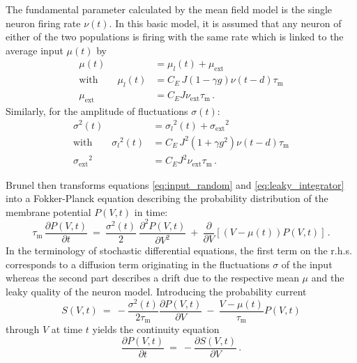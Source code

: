 The fundamental parameter calculated by the mean field model is the single neuron
firing rate $\nu(t)$. In this basic model, it is assumed that any neuron of either 
of the two populations is firing with the same rate which is linked to the 
average input $\mu(t)$ by
\begin{equation}
    \begin{split}
        \mu(t)          &= \mu_l(t) + \mu_\text{ext} \\
        \text{with} \qquad \mu_l(t)        &= C_E \, J (1 - \gamma g) \nu(t - d) \tau_\text{m} \\
        \mu_\text{ext}  &= C_E J \nu_\text{ext} \tau_\text{m} \,.
        \label{eq:mu}
    \end{split}
\end{equation}
Similarly, for the amplitude of fluctuations $\sigma(t)$:
\begin{equation}
    \begin{split}
        \sigma^2(t)     &= {\sigma_l}^2(t) + {\sigma_\text{ext}}^2 \\
        \text{with} \qquad {\sigma_l}^2(t)       
                        &= C_E \, J^2 (1 + \gamma g^2) \nu(t - d) \tau_\text{m} \\
        {\sigma_\text{ext}}^2  &= C_E J^2 \nu_\text{ext} \tau_\text{m} \,.
        \label{eq:sigma}
    \end{split}
\end{equation}

Brunel then transforms equations \eqref{eq:input_random} and \eqref{eq:leaky_integrator}
into a Fokker-Planck equation describing the probability distribution of the membrane 
potential $P(V, t)$ in time: 
\begin{equation}
    \tau_\text{m} \, \frac{\partial P(V, t)}{\partial t} 
       \: = \: \frac{\sigma^2(t)}{2}  \: \frac{\partial^2 P(V, t)}{\partial V^2} 
         \: + \: \frac{\partial }{\partial V}  [(V- \mu(t)) P(V, t)] \, .
    \label{eq:fokker_planck}
\end{equation}
In the terminology of stochastic differential equations, the first term on the 
r.h.s. corresponds to a diffusion term originating in the fluctuations $\sigma$ 
of the input whereas the second part describes a drift due to the respective mean $\mu$ 
and the leaky quality of the neuron model. Introducing the probability current 
\begin{equation}
    S(V, t) 
    \: = \: - \frac{\sigma^2(t)}{2 \tau_\text{m}} \frac{\partial P(V, t)}{\partial V}  
        \: - \: \frac{V - \mu(t)}{\tau_\text{m}} P(V, t)
    \label{eq:prob_curr}
\end{equation}
through $V$ at time $t$ yields the continuity equation 
\begin{equation}
    \frac{\partial P(V, t)}{\partial t} \:=\: - \frac{\partial S(V, t)}{\partial V} \,.
    \label{eq:continuity}
\end{equation}


